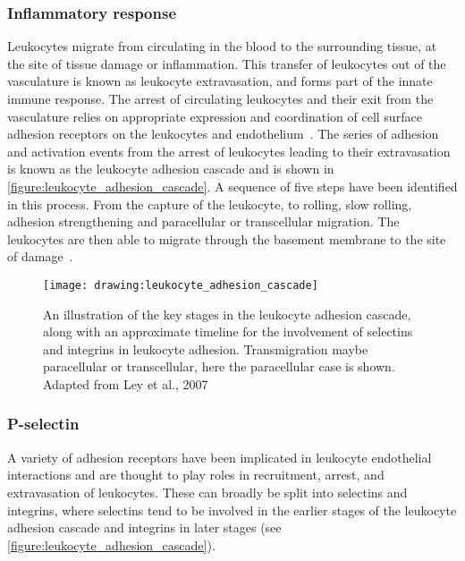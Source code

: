\subsubsection{Inflammatory response}
Leukocytes migrate from circulating in the blood to the surrounding tissue, at the site of tissue damage or inflammation. This transfer of leukocytes out of the vasculature is known as leukocyte extravasation, and forms part of the innate immune response. The arrest of circulating leukocytes and their exit from the vasculature relies on appropriate expression and coordination of cell surface adhesion receptors on the leukocytes and endothelium~\cite{Mayadas1993}. The series of adhesion and activation events from the arrest of leukocytes leading to their extravasation is known as the leukocyte adhesion cascade and is shown in \autoref{figure:leukocyte_adhesion_cascade}. A sequence of five steps have been identified in this process. From the capture of the leukocyte, to rolling, slow rolling, adhesion strengthening and paracellular or transcellular migration. The leukocytes are then able to migrate through the basement membrane to the site of damage~\cite{Ley2007}.

\begin{figure}[htbp!]
	\centering
	\texttt{[image: drawing:leukocyte\_adhesion\_cascade]}
	\caption[The leukocyte adhesion cascade]{An illustration of the key stages in the leukocyte adhesion cascade, along with an approximate timeline for the involvement of selectins and integrins in leukocyte adhesion. Transmigration maybe paracellular or transcellular, here the paracellular case is shown. Adapted from Ley et al., 2007~\cite{Ley2007}} 
	\label{figure:leukocyte_adhesion_cascade}
\end{figure}

\subsubsection{P-selectin}
A variety of adhesion receptors have been implicated in leukocyte endothelial interactions and are thought to play roles in recruitment, arrest, and extravasation of leukocytes. These can broadly be split into selectins and integrins, where selectins tend to be involved in the earlier stages of the leukocyte adhesion cascade and integrins in later stages (see \autoref{figure:leukocyte_adhesion_cascade}).

